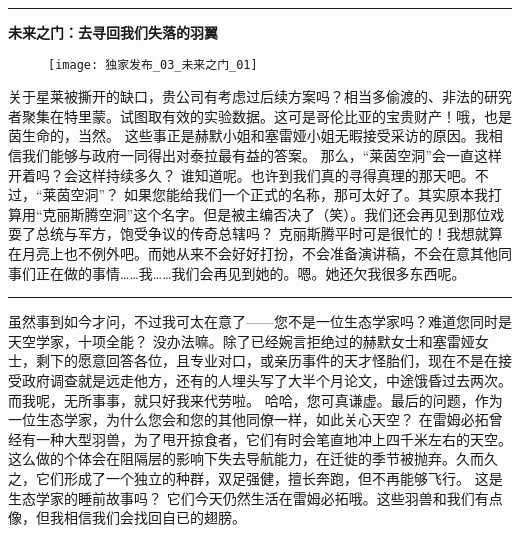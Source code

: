 \documentclass[openany]{book}
\begin{document}
\par\noindent\rule{\textwidth}{0.4pt}
\begin{center} \textbf{未来之门：去寻回我们失落的羽翼}\end{center}
\begin{figure}[h]
    \centering
    \texttt{[image: 独家发布\_03\_未来之门\_01]}
\end{figure}
\begin{dialogue}
     关于星莱被撕开的缺口，贵公司有考虑过后续方案吗？相当多偷渡的、非法的研究者聚集在特里蒙。试图取有效的实验数据。这可是哥伦比亚的宝贵财产！哦，也是茵生命的，当然。
     这些事正是赫默小姐和塞雷娅小姐无暇接受采访的原因。我相信我们能够与政府一同得出对泰拉最有益的答案。
     那么，“莱茵空洞”会一直这样开着吗？会这样持续多久？
     谁知道呢。也许到我们真的寻得真理的那天吧。不过，“莱茵空洞”？
     如果您能给我们一个正式的名称，那可太好了。其实原本我打算用“克丽斯腾空洞”这个名字。但是被主编否决了（笑）。我们还会再见到那位戏耍了总统与军方，饱受争议的传奇总辖吗？
     克丽斯腾平时可是很忙的！我想就算在月亮上也不例外吧。而她从来不会好好打扮，不会准备演讲稿，不会在意其他同事们正在做的事情……我……我们会再见到她的。嗯。她还欠我很多东西呢。
    \par\noindent\rule{\textwidth}{0.4pt}
     虽然事到如今才问，不过我可太在意了——您不是一位生态学家吗？难道您同时是天空学家，十项全能？
     没办法嘛。除了已经婉言拒绝过的赫默女士和塞雷娅女士，剩下的愿意回答各位，且专业对口，或亲历事件的天才怪胎们，现在不是在接受政府调查就是远走他方，还有的人埋头写了大半个月论文，中途饿昏过去两次。而我呢，无所事事，就只好我来代劳啦。
     哈哈，您可真谦虚。最后的问题，作为一位生态学家，为什么您会和您的其他同僚一样，如此关心天空？
     在雷姆必拓曾经有一种大型羽兽，为了甩开掠食者，它们有时会笔直地冲上四千米左右的天空。这么做的个体会在阻隔层的影响下失去导航能力，在迁徙的季节被抛弃。久而久之，它们形成了一个独立的种群，双足强健，擅长奔跑，但不再能够飞行。
     这是生态学家的睡前故事吗？
     它们今天仍然生活在雷姆必拓哦。这些羽兽和我们有点像，但我相信我们会找回自已的翅膀。
\end{dialogue}
\end{document}
